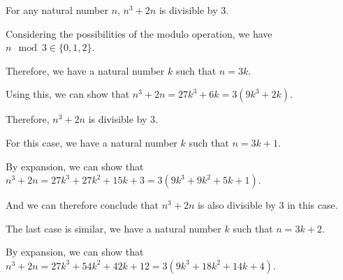For any natural number $n$, $n^3 + 2n$ is divisible by $3$.

Considering the possibilities of the modulo operation, we have $n \mod 3 \in \{0, 1, 2\}$.

Therefore, we have a natural number $k$ such that $n = 3k$.

Using this, we can show that $n^3 + 2n = 27k^3 + 6k = 3(9k^3+2k)$.

Therefore, $n^3 + 2n$ is divisible by $3$.

For this case, we have a natural number $k$ such that $n = 3k + 1$.

By expansion, we can show that $n^3 + 2n = 27k^3 + 27k^2 + 15k + 3 = 3(9k^3 + 9k^2 + 5k + 1)$.

And we can therefore conclude that $n^3 + 2n$ is also divisible by $3$ in this case.

The last case is similar, we have a natural number $k$ such that $n = 3k + 2$.

By expansion, we can show that $n^3 + 2n = 27k^3 + 54k^2 + 42k + 12 = 3(9k^3 + 18k^2 + 14k + 4)$.

